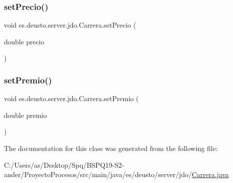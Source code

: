 \mbox{\label{classes_1_1deusto_1_1server_1_1jdo_1_1_carrera_ad573b2a0fbfe4889940497e81f5840aa}} 
\subsubsection{\texorpdfstring{setPrecio()}{setPrecio()}}
{\footnotesize\ttfamily void es.\+deusto.\+server.\+jdo.\+Carrera.\+set\+Precio (\begin{DoxyParamCaption}\item[{double}]{precio }\end{DoxyParamCaption})}

\mbox{\label{classes_1_1deusto_1_1server_1_1jdo_1_1_carrera_a815210f549d1d724250882806f9b62c4}} 
\subsubsection{\texorpdfstring{setPremio()}{setPremio()}}
{\footnotesize\ttfamily void es.\+deusto.\+server.\+jdo.\+Carrera.\+set\+Premio (\begin{DoxyParamCaption}\item[{double}]{premio }\end{DoxyParamCaption})}



The documentation for this class was generated from the following file\+:\begin{DoxyCompactItemize}
\item 
C\+:/\+Users/as/\+Desktop/\+Spq/\+B\+S\+P\+Q19-\/\+S2-\/ander/\+Proyecto\+Procesos/src/main/java/es/deusto/server/jdo/\mbox{\hyperlink{_carrera_8java}{Carrera.\+java}}\end{DoxyCompactItemize}
